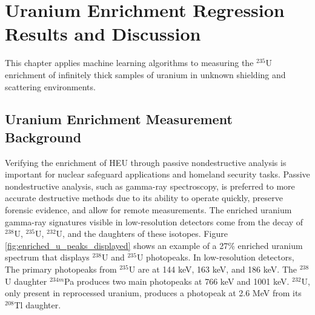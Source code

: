 \chapter[Uranium Enrichment Regression \newline Results and Discussion]{Uranium Enrichment Regression Results and Discussion}




This chapter applies machine learning algorithms to measuring the $^{235}$U enrichment of infinitely thick samples of uranium in unknown shielding and scattering environments.

\section{Uranium Enrichment Measurement Background}

Verifying the enrichment of HEU through passive nondestructive analysis is important for nuclear safeguard applications and homeland security tasks. Passive nondestructive analysis, such as gamma-ray spectroscopy, is preferred to more accurate destructive methods due to its ability to operate quickly, preserve forensic evidence, and allow for remote measurements. The enriched uranium gamma-ray signatures visible in low-resolution detectors come from the decay of $^{238}$U, $^{235}$U, $^{232}$U, and the daughters of these isotopes. Figure \ref{fig:enriched_u_peaks_displayed} shows an example of a 27\% enriched uranium spectrum that displays $^{238}$U and $^{235}$U photopeaks. In low-resolution detectors, The primary photopeaks from $^{235}$U are at 144 keV, 163 keV, and 186 keV. The $^{238}$U daughter $^{234m}$Pa produces two main photopeaks at 766 keV and 1001 keV. $^{232}$U, only present in reprocessed uranium, produces a photopeak at 2.6 MeV from its $^{208}$Tl daughter.

